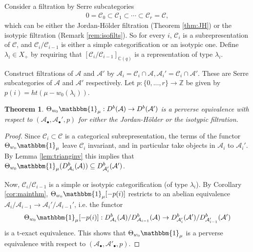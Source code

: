 \documentclass[11pt,reqno]{amsart}
\numberwithin{equation}{section}
\newtheorem{Theorem}[equation]{Theorem}
\theoremstyle{definition}
\theoremstyle{named}
\newcommand{\cA}{\mathcal{A}}
\newcommand{\cC}{\mathcal{C}}
\newcommand{\CC}{\mathbb{C}}
\newcommand{\ZZ}{\mathbb{Z}}
\newcommand{\bone}{\mathbbm{1}}
\begin{document}
Consider a filtration by Serre subcategories
\begin{align*}
0=\cC_0\subset \cC_1\subset \cdots \subset \cC_r=\cC,
\end{align*}
which can be either the Jordan-H\"older filtration (Theorem \ref{thm:JH}) or the isotypic filtration (Remark \ref{rem:isofilts}).  So for every $i$,  $\cC_i$ is a subrepresentation of $\cC$, and $\cC_i/\cC_{i-1}$ is either a simple categorification or an isotypic one.  Define $\lambda_i \in X_+$ by requiring that $[\cC_i/\cC_{i-1}]_{\CC(q)}$ is a representation of type $\lambda_i$.  




Construct filtrations of $\cA$ and $\cA'$ by $\cA_i=\cC_i\cap \cA, \cA_i'=\cC_i \cap \cA'$.  These are Serre subcategories of $\cA$ and $\cA'$ respectively.  Let $p:\{0,...,r\}\to \ZZ$ be given by 
$p(i)=ht(\mu-w_0(\lambda_i))$.  

\begin{Theorem}
\label{thm:perveq}
$\Theta_{w_0}\bone_\mu:D^b(\cA) \to D^b(\cA')$ is a perverse equivalence with respect to $(\cA_\bullet, \cA_\bullet',p)$ for either the Jordan-H\"older or the isotypic filtration. 
\end{Theorem}

%
\begin{proof}
Since $\cC_i \subset \cC$ is a categorical subrepresentation, the terms of the functor $\Theta_{w_0}\bone_\mu$ leave $\cC_i$ invariant, and in particular take objects in $\cA_i$ to $\cA_i'$.  By Lemma \ref{lem:trianginv} this implies that $\Theta_{w_0}\bone_\mu (D^b_{\cA_i}(\cA)) \subseteq D^b_{\cA_i'}(\cA')$.

Now, $\cC_i/\cC_{i-1}$ is a simple or isotypic categorification (of type $\lambda_i$).  By Corollary \ref{cor:mainthm}, $\Theta_{w_0}\bone_\mu[-p(i)]$ restricts to an abelian equivalence $\cA_i/\cA_{i-1} \to \cA_i'/\cA_{i-1}'$, i.e. the functor 
$$
\Theta_{w_0}\bone_\mu[-p(i)]:D^b_{\cA_i}(\cA)/D^b_{\cA_{i-1}}(\cA) \to D^b_{\cA'_i}(\cA')/D^b_{\cA'_{i-1}}(\cA')
$$
is a t-exact equivalence.  This shows that $\Theta_{w_0}\bone_\mu$ is a perverse equivalence with respect to $(\cA_\bullet, \cA'_\bullet, p)$.
\end{proof}
\end{document}
